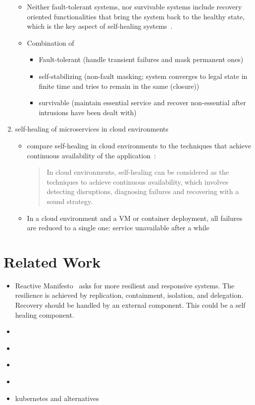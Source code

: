 \begin{enumerate}
\begin{itemize}
        \item Neither fault-tolerant systems, nor survivable systems include recovery oriented functionalities that bring the system back to the healthy state, which is the key aspect of self-healing systems~\cite{Ghosh}.

        \item Combination of~\cite{PsaierSurvey}
          \begin{itemize}
            \item Fault-tolerant (handle transient failures and mask permanent ones)
            \item self-stabilizing (non-fault masking; system converges to legal state in finite time and tries to remain in the same (closure))
            \item survivable (maintain essential service and recover non-essential after intrusions have been dealt with)
          \end{itemize}
      \end{itemize}

    \item self-healing of microservices in cloud environments
      \begin{itemize}
        \item \citeauthor{PsaierSurvey} compare self-healing in cloud environments to the techniques that achieve continuous availability of the application~\cite{PsaierSurvey}:
          \begin{quote}
            In cloud environments, self-healing can be considered as the techniques to achieve continuous availability, which involves detecting disruptions, diagnosing failures and recovering with a sound strategy.
          \end{quote}
        \item In a cloud environment and a VM or container deployment, all failures are reduced to a single one: service unavailable after a while
      \end{itemize}
  \end{enumerate}

\section{Related Work}
  \begin{itemize}
    \item Reactive Manifesto~\cite{reactivemanifesto} asks for more resilient and responsive systems. The resilience is achieved by replication, containment, isolation, and delegation. Recovery should be handled by an external component. This could be a self healing component.
    \item \cite{ToffettiMicroservices}
    \item \cite{StackCloud}
    \item \cite{gru}
    \item \cite{DashofyArchitecture}
    \item \gls{kubernetes} and alternatives
  \end{itemize}

